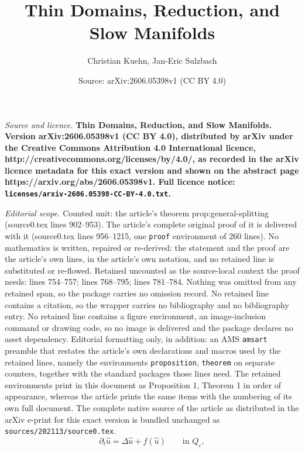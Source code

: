 \documentclass[10pt,a4paper]{amsart}
\title{\bf Thin Domains, Reduction, and Slow Manifolds}
\author{Christian Kuehn, Jan-Eric Sulzbach}
\date{Source: arXiv:2606.05398v1 (CC BY 4.0)}
\newcommand{\Qe}{Q_\varepsilon}
\begin{document}
\maketitle

\noindent\emph{Source and licence.} \bf Thin Domains, Reduction, and Slow Manifolds. Version arXiv:2606.05398v1 (CC BY 4.0), distributed by arXiv under the Creative Commons Attribution 4.0 International licence, http://creativecommons.org/licenses/by/4.0/, as recorded in the arXiv licence metadata for this exact version and shown on the abstract page https://arxiv.org/abs/2606.05398v1. Full licence notice: \texttt{licenses/arxiv-2606.05398-CC-BY-4.0.txt}.\par\smallskip

\noindent\textit{Editorial scope.} Counted unit: the article's theorem prop:general-splitting (source0.tex lines 902--953). The article's complete original proof of it is delivered with it (source0.tex lines 956--1215, one \texttt{proof} environment of 260 lines). No mathematics is written, repaired or re-derived: the statement and the proof are the article's own lines, in the article's own notation, and no retained line is substituted or re-flowed.  Retained uncounted as the source-local context the proof needs: lines 754--757; lines 768--795; lines 781--784.  Nothing was omitted from any retained span, so the package carries no omission record.  No retained line contains a citation, so the wrapper carries no bibliography and no bibliography entry.  No retained line contains a figure environment, an image-inclusion command or drawing code, so no image is delivered and the package declares no asset dependency.  Editorial formatting only, in addition: an AMS \texttt{amsart} preamble that restates the article's own declarations and macros used by the retained lines, namely the environments \texttt{proposition}, \texttt{theorem} on separate counters, together with the standard packages those lines need.  The retained environments print in this document as Proposition 1, Theorem 1 in order of appearance, whereas the article prints the same items with the numbering of its own full document.  The complete native source of the article as distributed in the arXiv e-print for this exact version is bundled unchanged as \texttt{sources/202113/source0.tex}.
\begin{equation}\label{eq:general-physical}
\partial_t \hat u = \Delta \hat u + f(\hat u)
\qquad\text{in }\Qe,
\end{equation}
\end{document}
